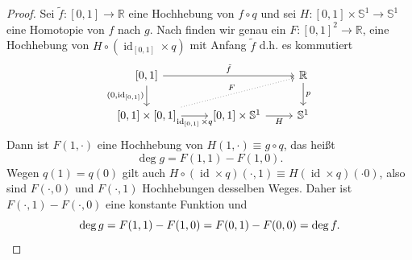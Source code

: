 \documentclass[
12pt, 
openany, 
a4paper, 
final,
fleqn, 
]{myclass}
\numberwithin{equation}{chapter}
\numberwithin{section}{chapter}
\newcommand{\RR}{\mathbb R}
\newcommand{\Ss}{\mathbb S}
\DeclareMathOperator{\id}{id}
\begin{document}
\begin{proof}
Sei $\tilde f:[0, 1]\to \RR$ eine Hochhebung von $f\circ q$ und sei $H: [0, 1]\times \Ss^1\to \Ss^1$ eine Homotopie von $f$ nach $g$. Nach  finden wir genau ein $F:[0, 1]^2 \to \RR$, eine Hochhebung von $H\circ (\id_{[0,1]} \times q)$ mit Anfang $\tilde f$ d.h. es kommutiert
\[ 
\begin{tikzcd}
	{[0,1]} \arrow{rr}{\tilde f}\arrow[swap]{d}{(0, \id_{[0,1]})} & & \RR \arrow{d}{p}\\
	{[0,1]\times [0,1]} \arrow[swap]{r}{\id_{[0,1]}\times q} \arrow[dotted]{urr}{F}& {[0,1]\times \Ss^1}\arrow[swap]{r}{H} & \Ss^1	
\end{tikzcd}
 \]
Dann ist $F(1, \cdot)$ eine Hochhebung von $H(1, \cdot) \equiv g\circ q$, das heißt
\[
\deg g = F(1, 1) - F(1, 0).
\]
Wegen $q(1)=q(0)$ gilt auch $ H\circ (\id\times q)(\cdot , 1) \equiv H(\id\times q)(\cdot 0) $, also sind $F(\cdot, 0)$ und $F(\cdot, 1)$ Hochhebungen desselben Weges. Daher ist $F(\cdot, 1)- F(\cdot, 0)$ eine konstante Funktion und 
\[
\deg g = F(1, 1) - F(1, 0) = F(0, 1) - F(0, 0) = \deg f. \qedhere
\]
\end{proof}
\end{document}
